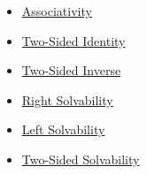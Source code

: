 \begin{dependencies}
\begin{itemize}
  \item \hyperref[def:associativity]{Associativity}
  \item \hyperref[def:two-sided-identity]{Two-Sided Identity}
  \item \hyperref[def:two-sided-inverse]{Two-Sided Inverse}
  \item \hyperref[def:right-solvability]{Right Solvability}
  \item \hyperref[def:left-solvability]{Left Solvability}
  \item \hyperref[def:two-sided-solvability]{Two-Sided Solvability}
\end{itemize}
\end{dependencies}
